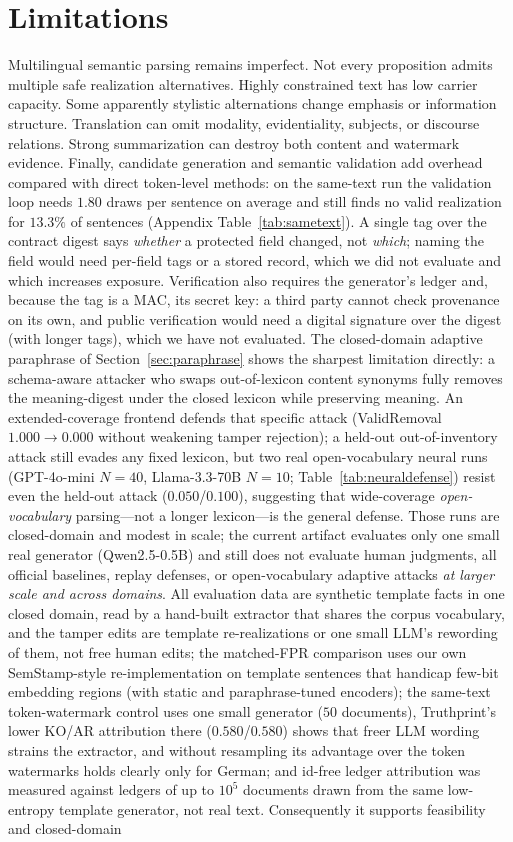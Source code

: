 \documentclass[11pt]{article}
\begin{document}
\section*{Limitations}
Multilingual semantic parsing remains imperfect. Not every proposition admits multiple safe realization alternatives. Highly constrained text has low carrier capacity. Some apparently stylistic alternations change emphasis or information structure. Translation can omit modality, evidentiality, subjects, or discourse relations. Strong summarization can destroy both content and watermark evidence. Finally, candidate generation and semantic validation add overhead compared with direct token-level methods: on the same-text run the validation loop needs $1.80$ draws per sentence on average and still finds no valid realization for $13.3\%$ of sentences (Appendix Table~\ref{tab:sametext}). A single tag over the contract digest says \emph{whether} a protected field changed, not \emph{which}; naming the field would need per-field tags or a stored record, which we did not evaluate and which increases exposure. Verification also requires the generator's ledger and, because the tag is a MAC, its secret key: a third party cannot check provenance on its own, and public verification would need a digital signature over the digest (with longer tags), which we have not evaluated. The closed-domain adaptive paraphrase of Section~\ref{sec:paraphrase} shows the sharpest limitation directly: a schema-aware attacker who swaps out-of-lexicon content synonyms fully removes the meaning-digest under the closed lexicon while preserving meaning. An extended-coverage frontend defends that specific attack (ValidRemoval $1.000\!\to\!0.000$ without weakening tamper rejection); a held-out out-of-inventory attack still evades any fixed lexicon, but two real open-vocabulary neural runs (GPT-4o-mini $N{=}40$, Llama-3.3-70B $N{=}10$; Table~\ref{tab:neuraldefense}) resist even the held-out attack ($0.050$/$0.100$), suggesting that wide-coverage \emph{open-vocabulary} parsing---not a longer lexicon---is the general defense. Those runs are closed-domain and modest in scale; the current artifact evaluates only one small real generator (Qwen2.5-0.5B) and still does not evaluate human judgments, all official baselines, replay defenses, or open-vocabulary adaptive attacks \emph{at larger scale and across domains}. All evaluation data are synthetic template facts in one closed domain, read by a hand-built extractor that shares the corpus vocabulary, and the tamper edits are template re-realizations or one small LLM's rewording of them, not free human edits; the matched-FPR comparison uses our own SemStamp-style re-implementation on template sentences that handicap few-bit embedding regions (with static and paraphrase-tuned encoders); the same-text token-watermark control uses one small generator ($50$ documents), Truthprint's lower KO/AR attribution there ($0.580$/$0.580$) shows that freer LLM wording strains the extractor, and without resampling its advantage over the token watermarks holds clearly only for German; and id-free ledger attribution was measured against ledgers of up to $10^5$ documents drawn from the same low-entropy template generator, not real text. Consequently it supports feasibility and closed-domain 
\end{document}
